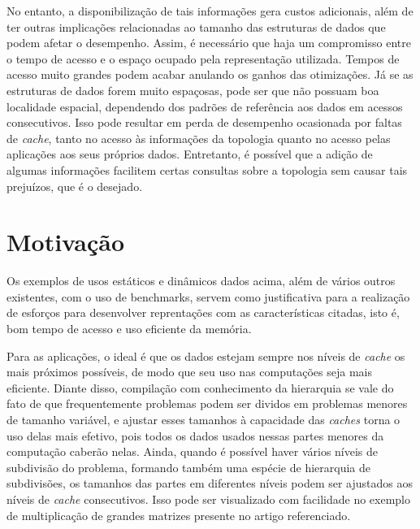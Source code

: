 
No entanto, a disponibilização de tais informações gera custos adicionais, além de ter outras implicações relacionadas ao tamanho das estruturas de dados que podem afetar o desempenho.
Assim, é necessário que haja um compromisso entre o tempo de acesso e o espaço ocupado pela representação utilizada.
Tempos de acesso muito grandes podem acabar anulando os ganhos das otimizações.
Já se as estruturas de dados forem muito espaçosas, pode ser que não possuam boa localidade espacial, dependendo dos padrões de referência aos dados em acessos consecutivos.
Isso pode resultar em perda de desempenho ocasionada por faltas de \textit{cache}, tanto no acesso às informações da topologia quanto no acesso pelas aplicações aos seus próprios dados.
Entretanto, é possível que a adição de algumas informações facilitem certas consultas sobre a topologia sem causar tais prejuízos, que é o desejado.



\section{Motivação}
\label{sec:motivacao}

Os exemplos de usos estáticos e dinâmicos dados acima, além de vários outros existentes, com o uso de benchmarks, servem como justificativa para a realização de esforços para desenvolver reprentações com as características citadas, isto é, bom tempo de acesso e uso eficiente da memória.

Para as aplicações, o ideal é que os dados estejam sempre nos níveis de \textit{cache} os mais próximos possíveis, de modo que seu uso nas computações seja mais eficiente.
Diante disso, compilação com conhecimento da hierarquia \cite{Sequoia} se vale do fato de que frequentemente problemas podem ser dividos em problemas menores de tamanho variável, e ajustar esses tamanhos à capacidade das \textit{caches} torna o uso delas mais efetivo, pois todos os dados usados nessas partes menores da computação caberão nelas.
Ainda, quando é possível haver vários níveis de subdivisão do problema, formando também uma espécie de hierarquia de subdivisões, os tamanhos das partes em diferentes níveis podem ser ajustados aos níveis de \textit{cache} consecutivos.
Isso pode ser visualizado com facilidade no exemplo de multiplicação de grandes matrizes presente no artigo referenciado.

